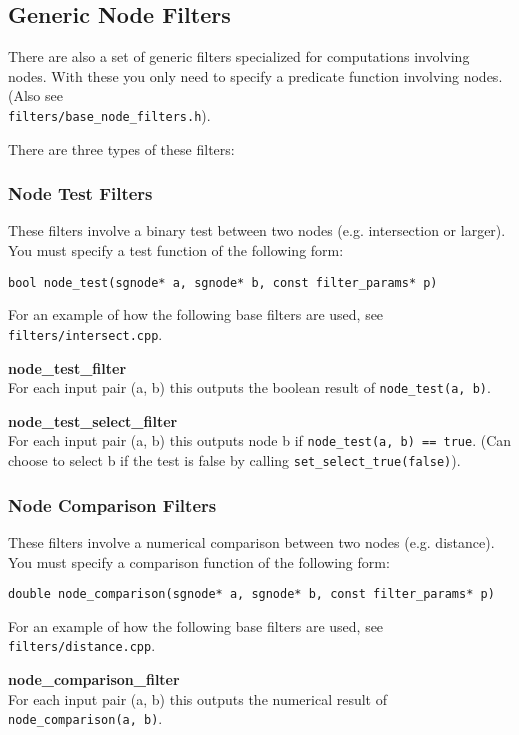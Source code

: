 \subsection{Generic Node Filters}
There are also a set of generic filters specialized for computations involving nodes. 
With these you only need to specify a predicate function involving nodes. (Also see \\
\texttt{filters/base\_node\_filters.h}).

There are three types of these filters:

\subsubsection{Node Test Filters}
These filters involve a binary test between two nodes (e.g. intersection or larger). 
You must specify a test function of the following form:
\begin{verbatim}
bool node_test(sgnode* a, sgnode* b, const filter_params* p)
\end{verbatim}
For an example of how the following base filters are used, see \texttt{filters/intersect.cpp}.

\textbf{node\_test\_filter} \\
For each input pair (a, b) this outputs the boolean result of \texttt{node\_test(a, b)}.

\textbf{node\_test\_select\_filter} \\
For each input pair (a, b) this outputs node b if \texttt{node\_test(a, b) == true}. 
(Can choose to select b if the test is false by calling \texttt{set\_select\_true(false)}).

\subsubsection{Node Comparison Filters}
These filters involve a numerical comparison between two nodes (e.g. distance). 
You must specify a comparison function of the following form:
\begin{verbatim}
double node_comparison(sgnode* a, sgnode* b, const filter_params* p)
\end{verbatim}

For an example of how the following base filters are used, see \texttt{filters/distance.cpp}.

\textbf{node\_comparison\_filter} \\
For each input pair (a, b) this outputs the numerical result of \texttt{node\_comparison(a, b)}. 

